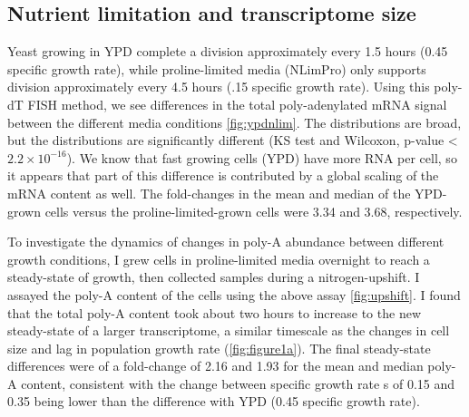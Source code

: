 
%
%
%
\subsection{Nutrient limitation and transcriptome size}
%
%
%

Yeast growing in
YPD complete a division approximately every 1.5 hours (0.45 specific
growth rate), while 
proline-limited media (NLimPro) only supports division approximately
every 4.5 hours (.15 specific growth rate). 
Using this poly-dT FISH method, we see differences in the total 
poly-adenylated mRNA signal between the different media conditions
\autoref{fig:ypdnlim}. 
The distributions are broad, but the distributions are significantly
different (KS test and Wilcoxon, p-value < $2.2 \times 10^{-16}$).
We know that fast growing cells (YPD) have more RNA per cell, so it
appears that part of this difference is contributed by a global
scaling of the mRNA content as well.
The fold-changes in the mean and median of the YPD-grown cells versus
the proline-limited-grown cells were 3.34 and 3.68, respectively.


To investigate the dynamics of changes in poly-A abundance between 
different growth conditions, I grew cells in proline-limited media
overnight to reach a steady-state of growth, then collected samples
during a nitrogen-upshift.
I assayed the poly-A content of the cells using the above assay
\autoref{fig:upshift}.
I found that the total poly-A content took about two hours to increase
to the new steady-state of a larger transcriptome, a similar timescale
as the changes in cell size and lag in population growth rate
(\autoref{fig:figure1a}).
The final steady-state differences were of a fold-change of 2.16 and
1.93 for the mean and median poly-A content, consistent with the
change between specific growth rate s of 0.15 and 0.35 being lower
than the difference with YPD (0.45 specific growth rate). 


